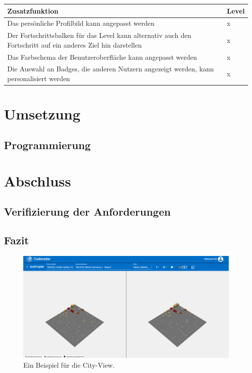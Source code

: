 \documentclass[
	oneside,  %
	ngerman, 
	final, 
	11pt, 
	a4paper, 
	1.1headlines, 
	headinclude=false, 
	footinclude=false, 
	mpinclude=false, 
	pagesize, 
	onecolumn, 
	titlepage, 
	parskip=half, 
	headsepline, 
	chapterprefix=false, 
	version=first, 
	listof=totoc, 
	bibliography=totoc, 
	toc=graduated, 
	fleqn
]{scrbook}
\begin{document}
\begin{center}
	\begin{tabular}{|p{12cm}|p{1cm}|}
		\hline
		Zusatzfunktion & Level \\ \hline
		Das persönliche Profilbild kann angepasst werden & x \\ \hline
		Der Fortschrittsbalken für das Level kann alternativ auch den Fortschritt auf ein anderes Ziel hin darstellen & x \\ \hline
		Das Farbschema der Benutzeroberfläche kann angepasst werden & x \\ \hline
		Die Auswahl an Badges, die anderen Nutzern angezeigt werden, kann personalisiert werden & x \\ \hline
	\end{tabular}
\end{center}

\chapter{Umsetzung}
\label{Umsetzung}


\section{Programmierung}
\label{Programmierung}


\chapter{Abschluss}
\label{Abschluss}


\section{Verifizierung der Anforderungen}
\label{Verifizierung_Anforderungen}


\section{Fazit}
\label{Fazit}


\begin{figure}[htb]
	\begin{center}
		\includegraphics[width=\linewidth]{images/city_view}
		\caption{Ein Beispiel für die City-View.}
		\label{city_view}
	\end{center}
\end{figure}
\end{document}
